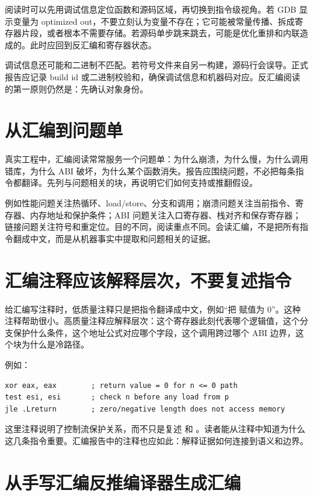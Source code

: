 阅读时可以先用调试信息定位函数和源码区域，再切换到指令级视角。若 GDB 显示变量为 optimized out，不要立刻认为变量不存在；它可能被常量传播、拆成寄存器片段，或者根本不需要存储。若源码单步跳来跳去，可能是优化重排和内联造成的。此时应回到反汇编和寄存器状态。

调试信息还可能和二进制不匹配。若符号文件来自另一构建，源码行会误导。正式报告应记录 build id 或二进制校验和，确保调试信息和机器码对应。反汇编阅读的第一原则仍然是：先确认对象身份。

\section{从汇编到问题单}

真实工程中，汇编阅读常常服务一个问题单：为什么崩溃，为什么慢，为什么调用错库，为什么 ABI 破坏，为什么某个函数消失。报告应围绕问题，不必把每条指令都翻译。先列与问题相关的块，再说明它们如何支持或推翻假设。

例如性能问题关注热循环、load/store、分支和调用；崩溃问题关注当前指令、寄存器、内存地址和保护条件；ABI 问题关注入口寄存器、栈对齐和保存寄存器；链接问题关注符号和重定位。目的不同，阅读重点不同。会读汇编，不是把所有指令翻成中文，而是从机器事实中提取和问题相关的证据。

\section{汇编注释应该解释层次，不要复述指令}

给汇编写注释时，低质量注释只是把指令翻译成中文，例如“把  赋值为 0”。这种注释帮助很小。高质量注释应解释层次：这个寄存器此刻代表哪个逻辑值，这个分支保护什么条件，这个地址公式对应哪个字段，这个调用跨过哪个 ABI 边界，这个块为什么是冷路径。

例如：

\begin{lstlisting}
xor eax, eax        ; return value = 0 for n <= 0 path
test esi, esi       ; check n before any load from p
jle .Lreturn        ; zero/negative length does not access memory
\end{lstlisting}

这里注释说明了控制流保护关系，而不只是复述  和 。读者能从注释中知道为什么这几条指令重要。汇编报告中的注释也应如此：解释证据如何连接到语义和边界。

\section{从手写汇编反推编译器生成汇编}

